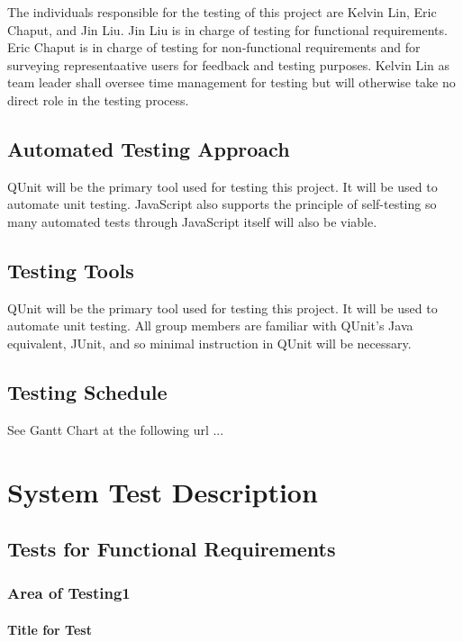 \documentclass[12pt, titlepage]{article}
\begin{document}
The individuals responsible for the testing of this project are  Kelvin Lin, Eric Chaput, and  Jin Liu. Jin Liu is in charge of testing for functional requirements. Eric Chaput is in charge of testing for non-functional requirements and for surveying representaative users for feedback and testing purposes. Kelvin Lin as team leader shall oversee time management for testing but will otherwise take no direct role in the testing process.

\subsection{Automated Testing Approach}

QUnit will be the primary tool used for testing this project. It will be used to automate unit testing. JavaScript also supports the principle of self-testing so many automated tests through JavaScript itself will also be viable.

\subsection{Testing Tools}

QUnit will be the primary tool used for testing this project. It will be used to automate unit testing. All group members are familiar with QUnit's Java equivalent, JUnit, and so minimal instruction in QUnit will be necessary.

\subsection{Testing Schedule}
		
See Gantt Chart at the following url ...

\section{System Test Description}
	
\subsection{Tests for Functional Requirements}

\subsubsection{Area of Testing1}
		
\paragraph{Title for Test}
\end{document}
